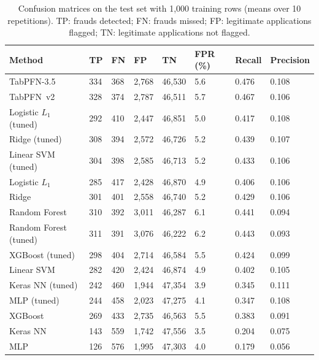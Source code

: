 \begin{table}[htbp]
\caption{Confusion matrices on the test set with 1{,}000 training rows (means over 10 repetitions). TP: frauds detected; FN: frauds missed; FP: legitimate applications flagged; TN: legitimate applications not flagged.}
\label{tab:conf1000}
\begin{tabular*}{\tblwidth}{@{}LLLLLLLL@{}}
\toprule
Method & TP & FN & FP & TN & FPR (\%) & Recall & Precision \\
\midrule
TabPFN-3.5 & 334 & 368 & 2{,}768 & 46{,}530 & 5.6 & 0.476 & 0.108 \\
TabPFN~v2 & 328 & 374 & 2{,}787 & 46{,}511 & 5.7 & 0.467 & 0.106 \\
Logistic $L_1$ (tuned) & 292 & 410 & 2{,}447 & 46{,}851 & 5.0 & 0.417 & 0.108 \\
Ridge (tuned) & 308 & 394 & 2{,}572 & 46{,}726 & 5.2 & 0.439 & 0.107 \\
Linear SVM (tuned) & 304 & 398 & 2{,}585 & 46{,}713 & 5.2 & 0.433 & 0.106 \\
Logistic $L_1$ & 285 & 417 & 2{,}428 & 46{,}870 & 4.9 & 0.406 & 0.106 \\
Ridge & 301 & 401 & 2{,}558 & 46{,}740 & 5.2 & 0.429 & 0.106 \\
Random Forest & 310 & 392 & 3{,}011 & 46{,}287 & 6.1 & 0.441 & 0.094 \\
Random Forest (tuned) & 311 & 391 & 3{,}076 & 46{,}222 & 6.2 & 0.443 & 0.093 \\
XGBoost (tuned) & 298 & 404 & 2{,}714 & 46{,}584 & 5.5 & 0.424 & 0.099 \\
Linear SVM & 282 & 420 & 2{,}424 & 46{,}874 & 4.9 & 0.402 & 0.105 \\
Keras NN (tuned) & 242 & 460 & 1{,}944 & 47{,}354 & 3.9 & 0.345 & 0.111 \\
MLP (tuned) & 244 & 458 & 2{,}023 & 47{,}275 & 4.1 & 0.347 & 0.108 \\
XGBoost & 269 & 433 & 2{,}735 & 46{,}563 & 5.5 & 0.383 & 0.091 \\
Keras NN & 143 & 559 & 1{,}742 & 47{,}556 & 3.5 & 0.204 & 0.075 \\
MLP & 126 & 576 & 1{,}995 & 47{,}303 & 4.0 & 0.179 & 0.056 \\
\bottomrule
\end{tabular*}
\end{table}

